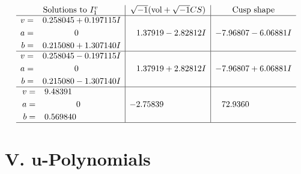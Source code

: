 \documentclass[1p]{elsarticle_modified}
\theoremstyle{definition}
\newcommand{\I}{\sqrt{-1}}
\begin{document}
$$\begin{array}{c|c|c}  
\text{Solutions to }I^v_{1}& \I (\text{vol} + \sqrt{-1}CS) & \text{Cusp shape}\\
 \hline 
\begin{aligned}
v &= \phantom{-}0.258045 + 0.197115 I \\
a &= \phantom{-0.000000 } 0 \\
b &= \phantom{-}0.215080 + 1.307140 I\end{aligned}
 & \phantom{-}1.37919 - 2.82812 I & -7.96807 - 6.06881 I \\ \hline\begin{aligned}
v &= \phantom{-}0.258045 - 0.197115 I \\
a &= \phantom{-0.000000 } 0 \\
b &= \phantom{-}0.215080 - 1.307140 I\end{aligned}
 & \phantom{-}1.37919 + 2.82812 I & -7.96807 + 6.06881 I \\ \hline\begin{aligned}
v &= \phantom{-}9.48391\phantom{ +0.000000I} \\
a &= \phantom{-0.000000 } 0 \\
b &= \phantom{-}0.569840\phantom{ +0.000000I}\end{aligned}
 & -2.75839\phantom{ +0.000000I} & \phantom{-}72.9360\phantom{ +0.000000I}\\
 \hline 
 \end{array}$$\newpage
\newpage\renewcommand{\arraystretch}{1}
\centering \section*{ V. u-Polynomials}
\end{document}
